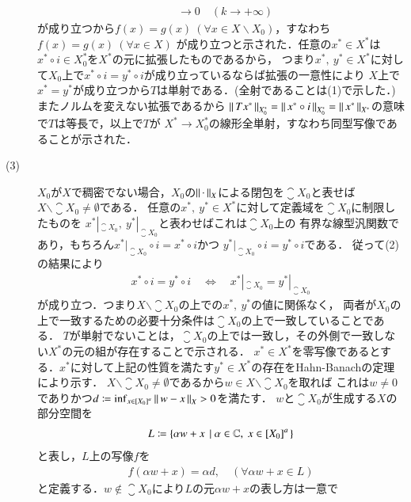 \begin{prf}
\begin{description}
\begin{align}
			&\longrightarrow 0 \quad (k \longrightarrow +\infty)
		\end{align}
		が成り立つから$f(x) = g(x)\ (\forall x \in X \backslash X_0)$，すなわち$f(x) = g(x)\ (\forall x \in X)$
		が成り立つと示された．任意の$x^* \in X^*$は$x^* \circ i \in X_0^*$を$X^*$の元に拡張したものであるから，
		つまり$x^*,\ y^* \in X^*$に対して$X_0$上で$x^* \circ i = y^* \circ i$が成り立っているならば拡張の一意性により
		$X$上で$x^* = y^*$が成り立つから$T$は単射である．(全射であることは(1)で示した．)またノルムを変えない拡張であるから
		$\left\|\, T x^*\, \right\|_{X_0^*} = \left\|\, x^* \circ i\, \right\|_{X_0^*} = \left\|\, x^*\, \right\|_{X^*}$の意味で$T$は等長で，以上で$T$が
		$X^* \longrightarrow X_0^*$の線形全単射，すなわち同型写像であることが示された．
	\item[(3)] $X_0$が$X$で稠密でない場合，$X_0$の$\left\|\, \cdot\, \right\|_{X}$による閉包を$\closure{X_0}$と表せば
		$X \backslash \closure{X_0} \neq \emptyset$である．
		任意の$x^*,\ y^* \in X^*$に対して定義域を$\closure{X_0}$に制限したものを
		$x^*|_{\closure{X_0}},\ y^*|_{\closure{X_0}}$と表わせばこれは$\closure{X_0}$上の
		有界な線型汎関数であり，もちろん$x^*|_{\closure{X_0}} \circ i = x^* \circ i$かつ
		$y^*|_{\closure{X_0}} \circ i = y^* \circ i$である．
		従って(2)の結果により
		\begin{align}
			x^* \circ i = y^* \circ i
			\quad \Leftrightarrow \quad x^*|_{\closure{X_0}} = y^*|_{\closure{X_0}}
		\end{align}
		が成り立つ．つまり$X \backslash \closure{X_0}$の上での$x^*,\ y^*$の値に関係なく，
		両者が$X_0$の上で一致するための必要十分条件は$\closure{X_0}$の上で一致していることである．
		$T$が単射でないことは，$\closure{X_0}$の上では一致し，その外側で一致しない$X^*$の元の組が存在することで示される．
		$x^* \in X^*$を零写像であるとする．$x^*$に対して上記の性質を満たす$y^* \in X^*$の存在をHahn-Banachの定理により示す．
		$X \backslash \closure{X_0} \neq \emptyset$であるから$w \in X \backslash \closure{X_0}$を取れば
		これは$w \neq 0$でありかつ$d \coloneqq \operatorname*{inf}_{x \in \left[X_0\right]^a} \left\|\, w - x\, \right\|_{X} > 0$を満たす．
		$w$と$\closure{X_0}$が生成する$X$の部分空間を
		\begin{align}
			L \coloneqq \left\{ \alpha w + x\ \left|\ \alpha \in \mathbb{C},\ x \in \left[X_0\right]^a \right.\right\}
		\end{align}
		と表し，$L$上の写像$f$を
		\begin{align}
			f(\alpha w + x) = \alpha d, \quad (\forall \alpha w + x \in L)
		\end{align}
		と定義する．$w \notin \closure{X_0}$により$L$の元$\alpha w + x$の表し方は一意で

\end{description}
\end{prf}
